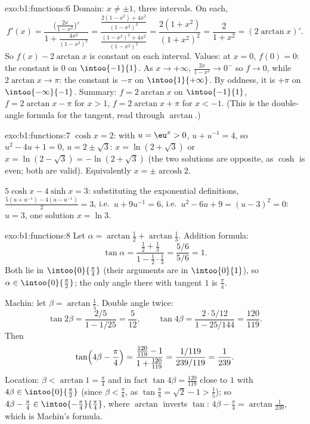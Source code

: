 \begin{solution}{exo:b1:functions:6}
Domain: $x \neq \pm 1$, three intervals. On each,
\[
f'(x) = \frac{\bigl(\frac{2x}{1-x^2}\bigr)'}{1 +
\frac{4x^2}{(1-x^2)^2}}
= \frac{\frac{2(1-x^2) + 4x^2}{(1-x^2)^2}}
{\frac{(1-x^2)^2 + 4x^2}{(1-x^2)^2}}
= \frac{2(1 + x^2)}{(1 + x^2)^2} = \frac{2}{1 + x^2}
= (2\arctan x)' .
\]
So $f(x) - 2\arctan x$ is constant on each interval. Values: at $x =
0$, $f(0) = 0$: the constant is $0$ on $\intoo{-1}{1}$. As $x \to
+\infty$, $\frac{2x}{1-x^2} \to 0^-$ so $f \to 0$, while $2\arctan x
\to \pi$: the constant is $-\pi$ on $\intoo{1}{+\infty}$. By oddness,
it is $+\pi$ on $\intoo{-\infty}{-1}$. Summary: $f = 2\arctan x$ on
$\intoo{-1}{1}$, $f = 2\arctan x - \pi$ for $x > 1$, $f = 2\arctan x +
\pi$ for $x < -1$. (This is the double-angle formula for the tangent,
read through $\arctan$.)
\end{solution}

\begin{solution}{exo:b1:functions:7}
$\cosh x = 2$: with $u = \eu^x > 0$, $u + u^{-1} = 4$, so $u^2 - 4u +
1 = 0$, $u = 2 \pm \sqrt 3$: $x = \ln(2 + \sqrt 3)$ or $x = \ln(2 -
\sqrt 3) = -\ln(2 + \sqrt 3)$ (the two solutions are opposite, as
$\cosh$ is even; both are valid). Equivalently $x = \pm
\operatorname{arcosh} 2$.

$5\cosh x - 4\sinh x = 3$: substituting the exponential definitions,
$\frac{5(u + u^{-1}) - 4(u - u^{-1})}{2} = 3$, i.e.\ $u + 9u^{-1} =
6$, i.e.\ $u^2 - 6u + 9 = (u - 3)^2 = 0$: $u = 3$, one solution $x =
\ln 3$.
\end{solution}

\begin{solution}{exo:b1:functions:8}
Let $\alpha = \arctan\frac12 + \arctan\frac13$. Addition formula:
\[
\tan\alpha = \frac{\frac12 + \frac13}{1 - \frac12\cdot\frac13}
= \frac{5/6}{5/6} = 1 .
\]
Both  lie in $\intoo{0}{\frac\pi4}$ (their arguments are in
$\intoo{0}{1}$), so $\alpha \in \intoo{0}{\frac\pi2}$; the only angle
there with tangent $1$ is $\frac\pi4$.

Machin: let $\beta = \arctan\frac15$. Double angle twice:
\[
\tan 2\beta = \frac{2/5}{1 - 1/25} = \frac{5}{12},
\qquad
\tan 4\beta = \frac{2 \cdot 5/12}{1 - 25/144} = \frac{120}{119}.
\]
Then
\[
\tan\Bigl(4\beta - \frac\pi4\Bigr)
= \frac{\frac{120}{119} - 1}{1 + \frac{120}{119}}
= \frac{1/119}{239/119} = \frac{1}{239}.
\]
Location: $\beta < \arctan 1 = \frac\pi4$ and in fact $\tan 4\beta =
\frac{120}{119}$ close to $1$ with $4\beta \in \intoo{0}{\frac\pi2}$
(since $\beta < \frac\pi8$, as $\tan\frac\pi8 = \sqrt 2 - 1 > \frac15$);
so $4\beta - \frac\pi4 \in \intoo{-\frac\pi4}{\frac\pi4}$, where
$\arctan$ inverts $\tan$: $4\beta - \frac\pi4 =
\arctan\frac{1}{239}$, which is Machin's formula.
\end{solution}

